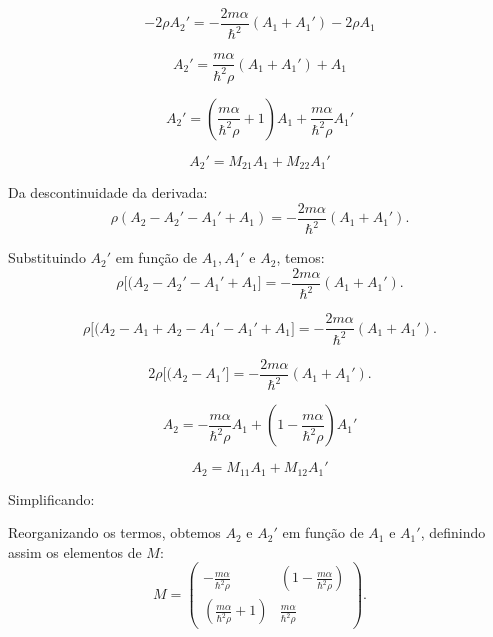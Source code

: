 \documentclass[a4paper,12pt]{article}
\begin{document}
\begin{enumerate}
\begin{equation}
- 2\rho A_2' = -\frac{2m\alpha}{\hbar^2} (A_1 + A_1') - 2\rho A_1
\end{equation}

\begin{equation}
A_2' = \frac{m\alpha}{\hbar^2 \rho} (A_1 + A_1') + A_1
\end{equation}

\begin{equation}
\boxed{A_2' =  \left(\frac{m\alpha}{\hbar^2 \rho} + 1\right)A_1 + \frac{m\alpha}{\hbar^2 \rho}A_1'}
\end{equation}

\begin{equation}
\boxed{A_2' = M_{21} A_1 + M_{22} A_1'}
\end{equation}

Da descontinuidade da derivada:
\begin{equation}
\rho (A_2 - A_2' - A_1' + A_1) = -\frac{2m\alpha}{\hbar^2} (A_1 + A_1').
\end{equation}

Substituindo \( A_2' \) em função de \( A_1, A_1' \) e \( A_2 \), temos:
\begin{equation}
\rho \big[(A_2 - A_2' - A_1' + A_1 \big] = -\frac{2m\alpha}{\hbar^2} (A_1 + A_1').
\end{equation}

\begin{equation}
\rho \big[(A_2 - A_1 + A_2 - A_1' - A_1' + A_1 \big] = -\frac{2m\alpha}{\hbar^2} (A_1 + A_1').
\end{equation}

\begin{equation}
    2\rho \big[(A_2 - A_1'\big] = -\frac{2m\alpha}{\hbar^2} (A_1 + A_1').
\end{equation}

\begin{equation}
\boxed{A_2 =  -\frac{m\alpha}{\hbar^2\rho}A_1 + \left(1 - \frac{m\alpha}{\hbar^2\rho}\right)A_1'}
\end{equation}

\begin{equation}
\boxed{A_2 = M_{11} A_1 + M_{12} A_1'}
\end{equation}

Simplificando:

Reorganizando os termos, obtemos \( A_2 \) e \( A_2' \) em função de \( A_1 \) e \( A_1' \), definindo assim os elementos de \( M \):
\begin{equation}
M = 
\begin{pmatrix}
    -\frac{m\alpha}{\hbar^2\rho} & \left(1 - \frac{m\alpha}{\hbar^2\rho}\right) \\
    \left(\frac{m\alpha}{\hbar^2 \rho} + 1\right) &  \frac{m\alpha}{\hbar^2 \rho}
\end{pmatrix}.
\end{equation}
    

\end{enumerate}
\end{document}
